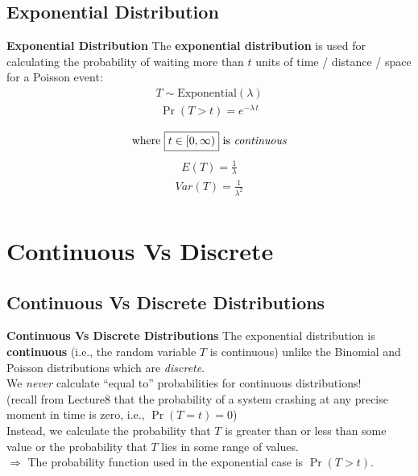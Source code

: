\documentclass[compress]{beamer}        %
\makeatletter
\newcommand{\tcb}{\textcolor{beamer@blendedblue}}
\makeatother
\begin{document}
\subsection{Exponential Distribution}
\begin{frame}{\bf \tcb{Exponential Distribution}}
The {\bf exponential distribution} is used for calculating the probability of waiting more than $t$ units of time / distance / space for a Poisson event:
\begin{align*}
\boxed{T \sim \text{Exponential}(\lambda)}
\end{align*}
\begin{align*}
\boxed{\Pr(T > t) = e^{-\lambda\,t}}\\[-1cm]
\end{align*}
\begin{align*}
\text{where } \boxed{t \in [0,\infty)} \text{ is \emph{continuous}}
\end{align*}
\begin{align*}
\boxed{E(T) = \frac{1}{\lambda}}
\end{align*}
\begin{align*}
\boxed{Var(T) = \frac{1}{\lambda^2}}\\[-0.5cm]
\end{align*}

\end{frame}

\section{Continuous Vs Discrete}
\subsection{Continuous Vs Discrete Distributions}
\begin{frame}{\bf \tcb{Continuous  Vs Discrete Distributions}}
The exponential distribution is {\bf continuous} (i.e., the random variable $T$ is continuous) unlike the Binomial and Poisson distributions which are \emph{discrete}.\\[0.6cm]

We \emph{never} calculate ``equal to'' probabilities for continuous distributions!\\[0.1cm]{\footnotesize(recall from Lecture8 that the probability of a system crashing at any precise moment in time is zero, i.e., $\Pr(T = t) = 0$)}\\[0.6cm]

Instead, we calculate the probability that $T$ is greater than or less than some value or the probability that $T$ lies in some range of values.\\[0.6cm]

$\Rightarrow$ The probability function used in the exponential case is $\Pr(T > t)$.

\end{frame}
\end{document}
